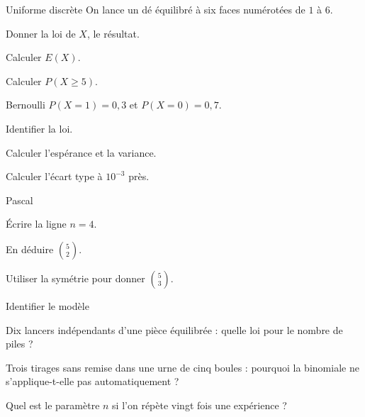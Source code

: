 \exercices
{}
\begingroup\renewcommand{\otBesoinPlace}[1]{}\begin{minipage}{\linewidth}
\begin{exercice}[1]{Uniforme discrète}
On lance un dé équilibré à six faces numérotées de $1$ à $6$.
\begin{questions}
\item Donner la loi de $X$, le résultat.
\item Calculer $E(X)$.
\item Calculer $P(X\geq5)$.
\end{questions}
\end{exercice}
\begin{exercice}[1]{Bernoulli}
$P(X=1)=0{,}3$ et $P(X=0)=0{,}7$.
\begin{questions}
\item Identifier la loi.
\item Calculer l’espérance et la variance.
\item Calculer l’écart type à $10^{-3}$ près.
\end{questions}
\end{exercice}
\begin{exercice}[1]{Pascal}

\begin{questions}
\item Écrire la ligne $n=4$.
\item En déduire $\binom52$.
\item Utiliser la symétrie pour donner $\binom53$.
\end{questions}
\end{exercice}
\begin{exercice}[1]{Identifier le modèle}

\begin{questions}
\item Dix lancers indépendants d’une pièce équilibrée : quelle loi pour le nombre de piles ?
\item Trois tirages sans remise dans une urne de cinq boules : pourquoi la binomiale ne s’applique-t-elle pas automatiquement ?
\item Quel est le paramètre $n$ si l’on répète vingt fois une expérience ?
\end{questions}
\end{exercice}
\end{minipage}\endgroup
\clearpage
{}

